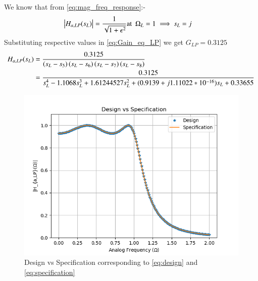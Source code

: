\documentclass{article}
\begin{document}
\begin{enumerate}
We know that from \eqref{eq:mag_freq_response}:-
\begin{align}
    \left\vert H_{a,LP}(s_L)\right\vert &= \frac{1}{\sqrt{1+\epsilon^2}} \text{at} \hspace{5pt} \Omega_{L}=1 \implies s_{L} = j \label{eq:Gain_eq_LP} 
\end{align}
Substituting respective values in \eqref{eq:Gain_eq_LP} we get $G_{LP}=0.3125$
\begin{align}
     H_{a,LP}(s_L) &= \frac{0.3125}{\left(s_L-s_5\right)\left(s_L-s_6\right)\left(s_L-s_7\right)\left(s_L-s_8\right)}\\
     &= \frac{0.3125}{s_{L}^4 - 1.1068s_{L}^3 +1.61244527s_{L}^2 + (0.9139+j1.11022*10^{-16})s_{L} +0.33655}\label{eq:design}
\end{align}
\begin{figure}[H]
\centering
\includegraphics[width=1\columnwidth]{figs/Design_vs_Specification.png}
\caption{Design vs Specification corresponding to \eqref{eq:design} and \eqref{eq:specification}}
\label{fig:design_vs_specf}
\end{figure}


\end{enumerate}
\end{document}
